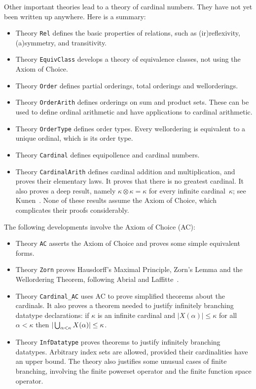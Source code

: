 Other important theories lead to a theory of cardinal numbers.  They have
not yet been written up anywhere.  Here is a summary:
\begin{itemize}
\item Theory \texttt{Rel} defines the basic properties of relations, such as
  (ir)reflexivity, (a)symmetry, and transitivity.

\item Theory \texttt{EquivClass} develops a theory of equivalence
  classes, not using the Axiom of Choice.

\item Theory \texttt{Order} defines partial orderings, total orderings and
  wellorderings.

\item Theory \texttt{OrderArith} defines orderings on sum and product sets.
  These can be used to define ordinal arithmetic and have applications to
  cardinal arithmetic.

\item Theory \texttt{OrderType} defines order types.  Every wellordering is
  equivalent to a unique ordinal, which is its order type.

\item Theory \texttt{Cardinal} defines equipollence and cardinal numbers.
 
\item Theory \texttt{CardinalArith} defines cardinal addition and
  multiplication, and proves their elementary laws.  It proves that there
  is no greatest cardinal.  It also proves a deep result, namely
  $\kappa\otimes\kappa=\kappa$ for every infinite cardinal~$\kappa$; see
  Kunen~\cite[page 29]{kunen80}.  None of these results assume the Axiom of
  Choice, which complicates their proofs considerably.  
\end{itemize}

The following developments involve the Axiom of Choice (AC):
\begin{itemize}
\item Theory \texttt{AC} asserts the Axiom of Choice and proves some simple
  equivalent forms.

\item Theory \texttt{Zorn} proves Hausdorff's Maximal Principle, Zorn's Lemma
  and the Wellordering Theorem, following Abrial and
  Laffitte~\cite{abrial93}.

\item Theory \verb|Cardinal_AC| uses AC to prove simplified theorems about
  the cardinals.  It also proves a theorem needed to justify
  infinitely branching datatype declarations: if $\kappa$ is an infinite
  cardinal and $|X(\alpha)| \le \kappa$ for all $\alpha<\kappa$ then
  $|\bigcup\sb{\alpha<\kappa} X(\alpha)| \le \kappa$.

\item Theory \texttt{InfDatatype} proves theorems to justify infinitely
  branching datatypes.  Arbitrary index sets are allowed, provided their
  cardinalities have an upper bound.  The theory also justifies some
  unusual cases of finite branching, involving the finite powerset operator
  and the finite function space operator.
\end{itemize}



